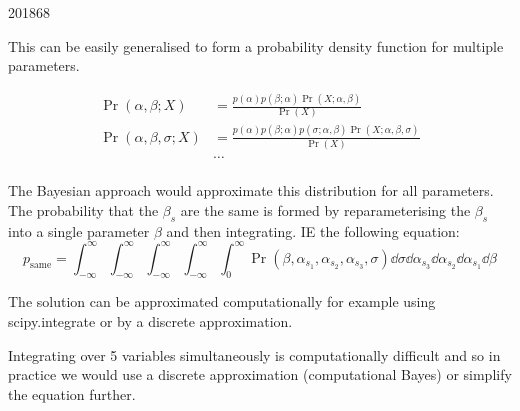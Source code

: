 \documentclass[10pt,\jkfside,a4paper]{article}
\begin{document}
\begin{examquestion}{2018}{6}{8}
\begin{enumerate}[label=(\alph*)]
\begin{itemize}
\end{itemize}

This can be easily generalised to form a probability density function for
multiple parameters.

\[
\begin{split}
\Pr(\alpha, \beta; X) &= \frac{p(\alpha)p(\beta; \alpha)\Pr(X; \alpha,
\beta)}{\Pr(X)} \\
\Pr(\alpha, \beta, \sigma; X) &= \frac{p(\alpha)p(\beta; \alpha)p(\sigma;
\alpha,\beta)\Pr(X; \alpha, \beta, \sigma)}{\Pr(X)} \\
&\dots \\
\end{split}
\]

The Bayesian approach would approximate this distribution for all parameters.
The probability that the $\beta_s$ are the same is formed by
reparameterising the $\beta_s$ into a single parameter $\beta$ and then
integrating. IE the following equation:
\[
p_{\text{same}} = \int^{\infty}_{-\infty}
\int^{\infty}_{-\infty}\int^{\infty}_{-\infty}\int^{\infty}_{-\infty}\int
^{\infty}_0 \Pr(\beta, \alpha_{s_1}, \alpha_{s_2}, \alpha_{s_3}, \sigma)
\dd{\sigma} \dd{\alpha_{s_3}} \dd{\alpha_{s_2}} \dd{\alpha_{s_1}} \dd{\beta}
\]

The solution can be approximated computationally for example using
scipy.integrate or by a discrete approximation.

Integrating over 5 variables simultaneously is computationally difficult
and so in practice we would use a discrete approximation (computational Bayes)
or simplify the equation further.

\end{enumerate}

\end{examquestion}
\end{document}
